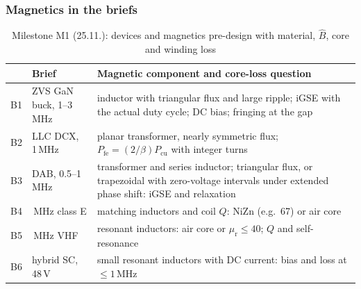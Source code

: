 \begin{frame}
	\frametitle{Magnetics in the briefs}
	\begin{table}
		\centering
		\footnotesize
		\begin{tabular}{|l|>{\raggedright\arraybackslash}p{3.0cm}|>{\raggedright\arraybackslash}p{9.6cm}|}
			\hline
			   & \textbf{Brief}           & \textbf{Magnetic component and core-loss question}                                                                    \\
			\hline
			B1 & ZVS GaN buck, 1--3\,MHz  & inductor with triangular flux and large ripple; iGSE with the actual duty cycle; DC bias; fringing at the gap      \\
			B2 & LLC DCX, 1\,MHz          & planar transformer, nearly symmetric flux; $P_\mathrm{fe}=(2/\beta)P_\mathrm{cu}$ with integer turns                 \\
			B3 & DAB, 0.5--1\,MHz         & transformer and series inductor; triangular flux, or trapezoidal with zero-voltage intervals under extended phase shift: iGSE and relaxation               \\
			B4 & 6.78\,MHz class E        & matching inductors and coil $Q$: NiZn (e.g.\ 67) or air core                                                       \\
			B5 & 13.56\,MHz VHF           & resonant inductors: air core or $\mu_\mathrm{r}\leq40$; $Q$ and self-resonance                                      \\
			B6 & hybrid SC, 48\,V         & small resonant inductors with DC current: bias and loss at $\leq1$\,MHz                                            \\
			\hline
		\end{tabular}
		\caption{Milestone M1 (25.11.): devices and magnetics pre-design with material, $\hat{B}$, core and winding loss}
	\end{table}
\end{frame}

